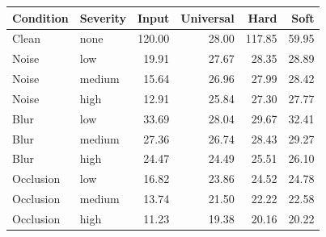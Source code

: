 \begin{tabular}{llrrrr}\toprule Condition & Severity & Input & Universal & Hard & Soft\\\midrule
Clean & none & 120.00 & 28.00 & 117.85 & 59.95\\
Noise & low & 19.91 & 27.67 & 28.35 & 28.89\\
Noise & medium & 15.64 & 26.96 & 27.99 & 28.42\\
Noise & high & 12.91 & 25.84 & 27.30 & 27.77\\
Blur & low & 33.69 & 28.04 & 29.67 & 32.41\\
Blur & medium & 27.36 & 26.74 & 28.43 & 29.27\\
Blur & high & 24.47 & 24.49 & 25.51 & 26.10\\
Occlusion & low & 16.82 & 23.86 & 24.52 & 24.78\\
Occlusion & medium & 13.74 & 21.50 & 22.22 & 22.58\\
Occlusion & high & 11.23 & 19.38 & 20.16 & 20.22\\
\bottomrule\end{tabular}